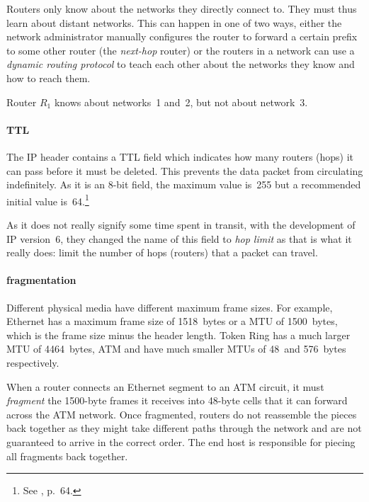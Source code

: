 Routers only know about the networks they directly connect to.
They must thus learn about distant networks.
This can happen in one of two ways, either the network administrator manually configures the router to forward a certain prefix to some other router (the \emph{next-hop} router) or the routers in a network can use a \emph{dynamic routing protocol} to teach each other about the networks they know and how to reach them.

\begin{marginfigure}
\noindent
{}
\caption{Router $R_1$ knows about networks~1 and~2, but not about network~3.}
\label{fig:ip-local-networks}
\end{marginfigure}

\paragraph{\acl{TTL}}
\label{par:ip-ttl}
The \acs{IP} header contains a \gls{TTL} field which indicates how many routers (hops) it can pass before it must be deleted.
This prevents the data packet from circulating indefinitely.
As it is an 8-bit field, the maximum value is~255 but a recommended initial value is~64.\footnote{See , p.~64.}

As it does not really signify some time spent in transit, with the development of \acs{IP} version~6, they changed the name of this field to \emph{hop limit} as that is what it really does: limit the number of hops (routers) that a packet can travel.


\paragraph{fragmentation}
\label{par:ip-fragmentation}
Different physical media have different maximum frame sizes.
For example, Ethernet has a maximum frame size of 1518~bytes or a \gls{MTU} of 1500~bytes, which is the frame size minus the header length.
Token Ring has a much larger \gls{MTU} of 4464~bytes, \gls{ATM} and  have much smaller \acp{MTU} of 48~and 576~bytes respectively.

When a router connects an Ethernet segment to an \gls{ATM} circuit, it must \emph{fragment} the 1500-byte frames it receives into 48-byte cells that it can forward across the \ac{ATM} network.
Once fragmented, routers do not reassemble the pieces back together as they might take different paths through the network and are not guaranteed to arrive in the correct order.
The end host is responsible for piecing all fragments back together.


